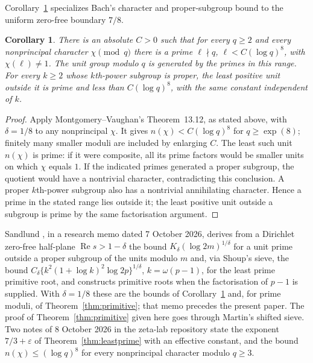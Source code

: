 \documentclass[11pt]{article}
\newtheorem{corollary}[theorem]{Corollary}
\theoremstyle{definition}
\DeclareMathOperator{\Rea}{Re}
\begin{document}
Corollary~\ref{cor:generators} specializes Bach's character and
proper-subgroup bound \cite[p.~293, unnumbered theorem and the subsequent
subgroup reduction]{Bach1982} to the uniform zero-free boundary $7/8$.

\begin{corollary}\label{cor:generators}
There is an absolute $C>0$ such that for every $q\ge2$ and every
nonprincipal character $\chi\pmod q$ there is a prime
$\ell\nmid q$, $\ell<C(\log q)^8$, with $\chi(\ell)\ne1$.
The unit group modulo $q$ is generated by the primes in this range.
For every $k\ge2$ whose $k$th-power subgroup is proper, the least
positive unit outside it is prime and less than $C(\log q)^8$,
with the same constant independent of $k$.
\end{corollary}
\begin{proof}
Apply Montgomery--Vaughan's Theorem~13.12, as stated above, with
$\delta=1/8$ to any nonprincipal $\chi$. It gives
$n(\chi)<C(\log q)^8$ for $q\ge\exp(8)$; finitely many smaller
moduli are included by enlarging $C$.
The least such unit $n(\chi)$ is prime: if it were composite,
all its prime factors would be smaller units on which $\chi$ equals $1$.
If the indicated primes generated a proper subgroup, the quotient
would have a nontrivial character, contradicting this conclusion.
A proper $k$th-power subgroup also has a nontrivial annihilating
character. Hence a prime in the stated range lies outside it;
the least positive unit outside a subgroup is prime by the same
factorisation argument.
\end{proof}

Sandlund \cite{Sandlund2026}, in a research memo dated 7 October 2026,
derives from a Dirichlet zero-free half-plane $\Rea s>1-\delta$ the
bound $K_\delta(\log 2m)^{1/\delta}$ for a unit prime outside a proper
subgroup of the units modulo $m$ and, via Shoup's sieve, the bound
$C_\delta\{k^2(1+\log k)^2\log 2p\}^{1/\delta}$, $k=\omega(p-1)$, for
the least prime primitive root, and constructs primitive roots when the
factorisation of $p-1$ is supplied.
With $\delta=1/8$ these are the bounds of
Corollary~\ref{cor:generators} and, for prime moduli, of
Theorem~\ref{thm:primitive}; that memo precedes the present paper.
The proof of Theorem~\ref{thm:primitive} given here goes through
Martin's shifted sieve.
Two notes of 8 October 2026 in the zeta-lab repository
\cite{ZetaLab2026} state the exponent $7/3+\varepsilon$ of
Theorem~\ref{thm:leastprime} with an effective constant, and the bound
$n(\chi)\le(\log q)^8$ for every nonprincipal character modulo
$q\ge3$.
\end{document}
